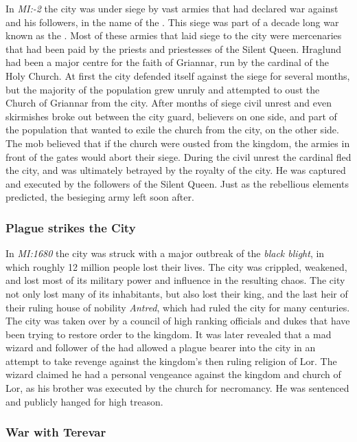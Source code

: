 In \emph{MI:-2} the city was under siege by vast armies that had declared war
against  and his followers, in the name of the
. This siege was part of a decade long war known as
the . Most of these armies that laid siege to the
city were mercenaries that had been paid by the priests and priestesses of the
Silent Queen. Hraglund had been a major centre for the faith of Griannar, run
by the cardinal of the Holy Church. At first the city defended itself against
the siege for several months, but the majority of the population grew unruly
and attempted to oust the Church of Griannar from the city. After months of
siege civil unrest and even skirmishes broke out between the city guard,
believers on one side, and part of the population that wanted to exile the
church from the city, on the other side. The mob believed that if the church
were ousted from the kingdom, the armies in front of the gates would abort
their siege. During the civil unrest the cardinal fled the city, and was
ultimately betrayed by the royalty of the city. He was captured and executed
by the followers of the Silent Queen. Just as the rebellious elements
predicted, the besieging army left soon after.

\subsubsection{Plague strikes the City}
\label{sec:Plague of Hraglund}

In \emph{MI:1680} the city was struck with a major outbreak of the \emph{black
  blight}, in which roughly 12 million people lost their lives. The city was
crippled, weakened, and lost most of its military power and influence in the
resulting chaos. The city not only lost many of its inhabitants, but also lost
their king, and the last heir of their ruling house of nobility \emph{Antred},
which had ruled the city for many centuries. The city was taken over by a
council of high ranking officials and dukes that have been trying to restore
order to the kingdom. It was later revealed that a mad wizard and follower of
the  had allowed a plague bearer into the city in an attempt
to take revenge against the kingdom's then ruling religion of Lor. The wizard
claimed he had a personal vengeance against the kingdom and church of Lor, as
his brother was executed by the church for necromancy. He was sentenced and
publicly hanged for high treason.

\subsubsection{War with Terevar}
\label{sec:Terevar}

